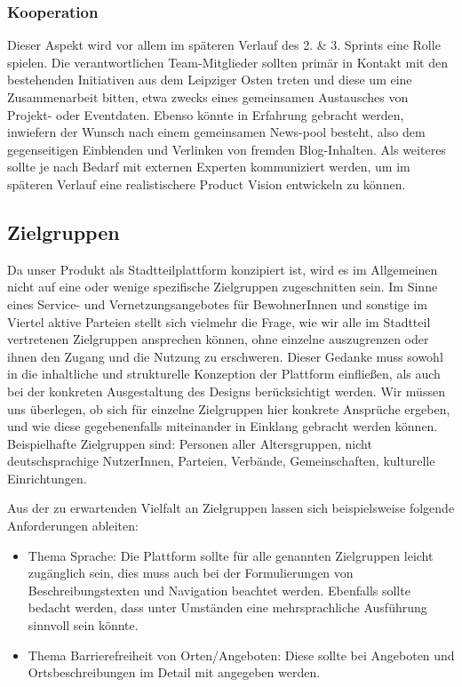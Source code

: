 \documentclass{swp}
\begin{document}
\subsubsection{Kooperation}
Dieser Aspekt wird vor allem im sp\"ateren Verlauf des 2. \& 3. Sprints eine Rolle spielen. Die verantwortlichen Team-Mitglieder sollten prim\"ar in Kontakt mit den bestehenden Initiativen aus dem Leipziger Osten treten und diese um eine Zusammenarbeit bitten, etwa zwecks eines gemeinsamen Austausches von Projekt- oder Eventdaten. Ebenso k\"onnte in Erfahrung gebracht werden, inwiefern der Wunsch nach einem gemeinsamen \glqq News-pool\grqq{} besteht, also dem gegenseitigen Einblenden und Verlinken von \glqq fremden\grqq{} Blog-Inhalten. Als weiteres sollte je nach Bedarf mit \glqq externen Experten\grqq{} kommuniziert werden, um im sp\"ateren Verlauf eine realistischere Product Vision entwickeln zu k\"onnen.
\subsection{Zielgruppen}
Da unser Produkt als Stadtteilplattform konzipiert ist, wird es im Allgemeinen nicht auf eine oder wenige spezifische Zielgruppen zugeschnitten sein. Im Sinne eines Service- und Vernetzungsangebotes f\"ur BewohnerInnen und sonstige im Viertel aktive Parteien stellt sich vielmehr die Frage, wie wir alle im Stadtteil vertretenen Zielgruppen ansprechen k\"onnen, ohne einzelne auszugrenzen oder ihnen den Zugang und die Nutzung zu erschweren. Dieser Gedanke muss sowohl in die inhaltliche und strukturelle Konzeption der Plattform einflie{\ss}en, als auch bei der konkreten Ausgestaltung des Designs ber\"ucksichtigt werden. Wir m\"ussen uns \"uberlegen, ob sich f\"ur einzelne Zielgruppen hier konkrete Anspr\"uche ergeben, und wie diese gegebenenfalls miteinander in Einklang gebracht werden k\"onnen.\\
Beispielhafte Zielgruppen sind: Personen aller Altersgruppen, nicht deutschsprachige NutzerInnen, Parteien, Verb\"ande, Gemeinschaften, kulturelle Einrichtungen.

Aus der zu erwartenden Vielfalt an Zielgruppen lassen sich beispielsweise folgende Anforderungen ableiten:
\begin{itemize}
\item Thema Sprache: Die Plattform sollte f\"ur alle genannten Zielgruppen leicht zug\"anglich sein, dies muss auch bei der Formulierungen von Beschreibungstexten und Navigation beachtet werden. Ebenfalls sollte bedacht werden, dass unter Umst\"anden eine mehrsprachliche Ausf\"uhrung sinnvoll sein k\"onnte.
\item Thema Barrierefreiheit von Orten/Angeboten: Diese sollte bei Angeboten und Ortsbeschreibungen im Detail mit angegeben werden.
\end{itemize}
\end{document}
